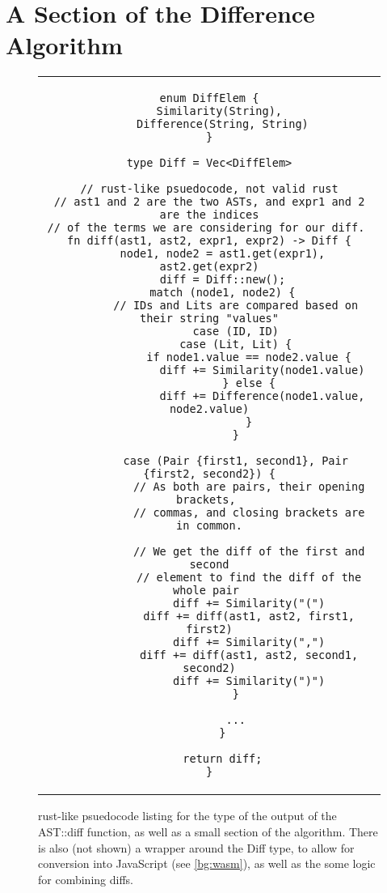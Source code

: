 \chapter{A Section of the Difference Algorithm}
\begin{figure}[h]
    \begin{tabular}{c}
    \begin{lstlisting}[language=Rust_boxed]
enum DiffElem {
    Similarity(String), 
    Difference(String, String)
}

type Diff = Vec<DiffElem>

// rust-like psuedocode, not valid rust
// ast1 and 2 are the two ASTs, and expr1 and 2 are the indices
// of the terms we are considering for our diff. 
fn diff(ast1, ast2, expr1, expr2) -> Diff {
    node1, node2 = ast1.get(expr1), ast2.get(expr2)
    diff = Diff::new();
    match (node1, node2) {
        // IDs and Lits are compared based on their string "values"
        case (ID, ID)
        case (Lit, Lit) {
            if node1.value == node2.value {
                diff += Similarity(node1.value)
            } else {
                diff += Difference(node1.value, node2.value)
            }
        }

        case (Pair {first1, second1}, Pair {first2, second2}) {
            // As both are pairs, their opening brackets, 
            // commas, and closing brackets are in common.

            // We get the diff of the first and second
            // element to find the diff of the whole pair 
            diff += Similarity("(")
            diff += diff(ast1, ast2, first1, first2)
            diff += Similarity(",")
            diff += diff(ast1, ast2, second1, second2)
            diff += Similarity(")")
        }

        ...
    }
    
    return diff;
}
    \end{lstlisting}
    \end{tabular}
    \caption{rust-like psuedocode listing for the type of the output of the AST::diff function, as well as a small section of the algorithm. There is also (not shown) a wrapper around the Diff type, to allow for conversion into JavaScript (see \ref{bg:wasm}), as well as the some logic for combining diffs.}
    \label{fig:diff_list}
\end{figure}